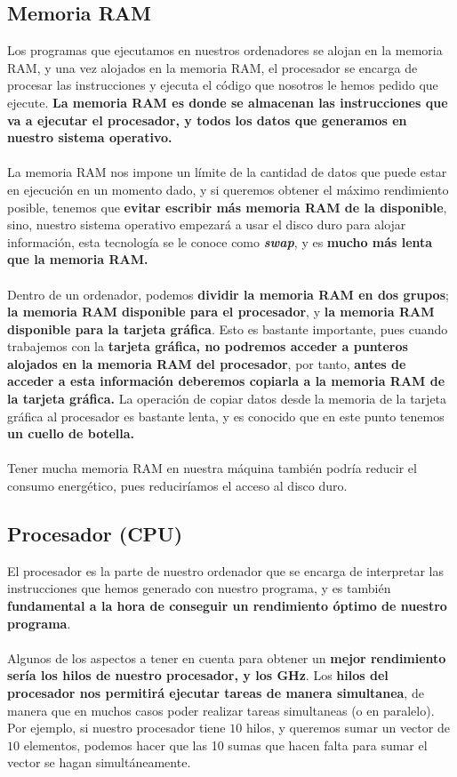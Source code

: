 \subsection{Memoria RAM}
Los programas que ejecutamos en nuestros ordenadores se alojan en la memoria RAM, y una vez alojados en la memoria RAM, el procesador se encarga de procesar las instrucciones y ejecuta el código que nosotros le hemos pedido que ejecute. \textbf{La memoria RAM es donde se almacenan las instrucciones que va a ejecutar el procesador, y todos los datos que generamos en nuestro sistema operativo.}
\\ \\
La memoria RAM nos impone un límite de la cantidad de datos que puede estar en ejecución en un momento dado, y si queremos obtener el máximo rendimiento posible, tenemos que \textbf{evitar escribir más memoria RAM de la disponible}, sino, nuestro sistema operativo empezará a usar el disco duro para alojar información, esta tecnología se le conoce como \textbf{\textit{swap}}, y es \textbf{mucho más lenta que la memoria RAM.}
\\ \\
Dentro de un ordenador, podemos \textbf{dividir la memoria RAM en dos grupos}; \textbf{la memoria RAM disponible para el procesador}, y  \textbf{la memoria RAM disponible para la tarjeta gráfica}. Esto es bastante importante, pues cuando trabajemos con la \textbf{tarjeta gráfica, no podremos acceder a punteros alojados en la memoria RAM del procesador}, por tanto, \textbf{antes de acceder a esta información deberemos copiarla a la memoria RAM de la tarjeta gráfica.} La operación de copiar datos desde la memoria de la tarjeta gráfica al procesador es bastante lenta, y es conocido que en este punto tenemos \textbf{un cuello de botella.}
\\ \\
Tener mucha memoria RAM en nuestra máquina también podría reducir el consumo energético, pues reduciríamos el acceso al disco duro.

\subsection{Procesador (CPU)}
El procesador es la parte de nuestro ordenador que se encarga de interpretar las instrucciones que hemos generado con nuestro programa, y es también \textbf{fundamental a la hora de conseguir un rendimiento óptimo de nuestro programa}. \\ \\
Algunos de los aspectos a tener en cuenta para obtener un \textbf{mejor rendimiento sería los hilos de nuestro procesador, y los GHz}. Los \textbf{hilos del procesador nos permitirá ejecutar tareas de manera simultanea}, de manera que en muchos casos poder realizar tareas simultaneas (o en paralelo). Por ejemplo, si nuestro procesador tiene $10$ hilos, y queremos sumar un vector de $10$ elementos, podemos hacer que las 10 sumas que hacen falta para sumar el vector se hagan simultáneamente.

